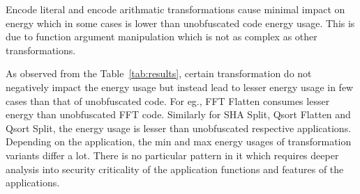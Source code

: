 Encode literal and encode arithmatic transformations cause minimal impact on energy which in some cases is lower than unobfuscated code energy usage. This is due to function argument manipulation which is not as complex as other transformations.


As observed from the Table~\ref{tab:results}, certain transformation do not negatively impact the energy usage but instead lead to lesser energy usage in few cases than that of unobfuscated code. For eg., FFT Flatten consumes lesser energy than unobfuscated FFT code. Similarly for SHA Split, Qsort Flatten and Qsort Split, the energy usage is lesser than unobfuscated respective applications.
Depending on the application, the min and max energy usages of transformation variants differ a lot. There is no particular pattern in it which requires deeper analysis into security criticality of the application functions  and features of the applications.




\endinput
The immediate impact of the obfuscation transformation seems highest for virtualize in terms of energy usage due to higher runtimes and higher power drawn during execution.

It reaches as far as 1.02 times to 83.26 times of increase in average energy usage to that of unobfuscated code for CRC32. 
It reaches as far as 0.70 times to 47.83 times of increase in average energy usage to that of unobfuscated code for FFT.
It reaches as far as 0.74 times to 2239.39 times of increase in average energy usage to that of unobfuscated code for SHA.
It reaches as far as 0.64 times to 2.48 times of increase in average energy usage to that of unobfuscated code for Patricia.
It reaches as far as 0.68 times to 17.12 times of increase in average energy usage to that of unobfuscated code for Qsort.





